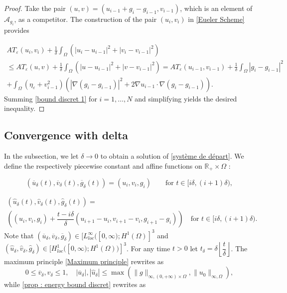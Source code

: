 \documentclass[reqno,12pt,twoside]{amsart}
\numberwithin{equation}{section} \numberwithin{theorem}{section}
\numberwithin{proposition}{section} \numberwithin{lemma}{section}
\numberwithin{corollary}{section}
\numberwithin{definition}{section} \numberwithin{remark}{section}
\begin{document}
\begin{proof}
Take the pair $(u,v) = (u_{i-1} + g_i - g_{i-1} , v_{i-1})$, which is an element of $\mathcal{A}_{g_i}$, as a competitor. The construction of the pair $(u_i, v_i)$ in \autoref{Eueler Scheme} provides 
%
%

\begin{multline}\label{bound discret 1}
AT_\varepsilon (u_i,  v_i) + \frac{1}{\delta} \int_\Omega \left(|u_i -u_{i-1}|^2 + |v_i -v_{i-1}|^2\right)\\
\leqslant AT_\varepsilon (u,  v) + \frac{1}{\delta} \int_\Omega \left(|u -u_{i-1}|^2 + |v -v_{i-1}|^2\right) 
=AT_\varepsilon (u_{i-1}, v_{i-1}) + \frac{1}{\delta} \int_\Omega |g_i -g_{i-1}|^2\\
+ \int_\Omega (\eta_\varepsilon + v_{i-1} ^2)\left(|\nabla (g_i - g_{i-1})|^2 + 2\nabla u_{i-1} \cdot \nabla (g_i - g_{i-1})\right).
\end{multline}
Summing \eqref{bound discret 1} for $i=1, \ldots , N$ and simplifying yields the desired inequality. 
\end{proof}

\subsection{Convergence with delta}

In the subsection, we let $\delta \rightarrow 0$ to obtain a solution of \eqref{système de départ}. 
We define the respectively piecewise constant and affine functions on $\mathbb{R}_+ \times \Omega$ : 

\[(\overline{u}_\delta (t), \overline{v}_\delta (t),\overline{g}_\delta (t) )= (u_i , v_i, g_i) \quad \quad  \text{for } t\in [i\delta , (i+1)\delta ),\]

\begin{multline*}
(\hat{u}_\delta (t) , \hat{v}_\delta (t), \hat{g}_\delta (t)) = \\
\left((u_i , v_i, g_i) + \dfrac{t-i\delta}{\delta} (u_{i+1} - u_i, v_{i+1}- v_i, g_{i+1}-g_i)\right) \quad \text{for }t\in [i\delta , (i+1)\delta ).
\end{multline*}
Note that $(\overline{u}_\delta, \overline{v}_\delta, \overline{g}_\delta) \in [L^\infty_{loc}([0,\infty); H^1(\Omega)]^3$ and $(\hat{u}_\delta, \hat{v}_\delta, \hat{g}_\delta) \in [H^1_{loc}([0,\infty);H^1(\Omega))]^3$. 
For any time $t>0$ let $t_\delta = \delta \left\lfloor\dfrac{t}{\delta}\right\rfloor$. The maximum principle \autoref{Maximum principle} rewrites as 
\begin{equation}\label{max prin delta}
0\leqslant \overline{v}_\delta, \hat{v}_\delta \leqslant 1, \quad |\overline{u}_\delta|, |\hat{u}_\delta| \leqslant \max(\|g\|_{\infty, (0,+\infty)\times \Omega}, \|u_0\|_{\infty,\Omega}), 
\end{equation}
while \autoref{prop : energy bound discret} rewrites as 
\end{document}
